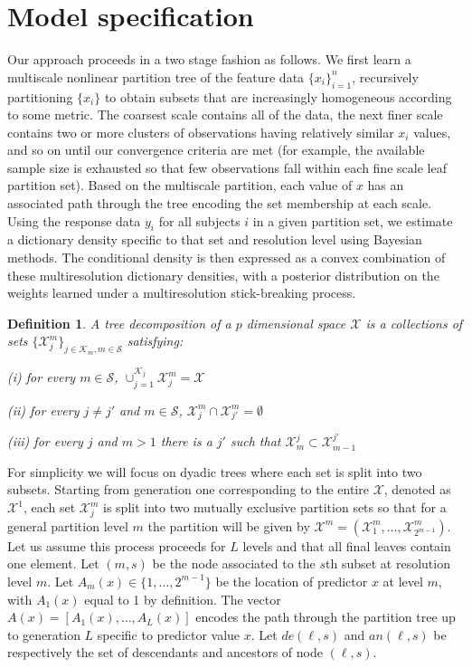 \documentclass{article} %
\newtheorem{definition}[theorem]{Definition}
\begin{document}
\section{Model specification} \label{section:model}

Our approach proceeds in a two stage fashion as follows. We first learn a multiscale nonlinear partition tree of the feature data $\{ x_i \}_{i=1}^n$, recursively partitioning $\{x_i \}$ to obtain subsets that are increasingly homogeneous according to some metric.  The coarsest scale contains all of the data, the next finer scale contains two or more clusters of observations having relatively similar $x_i$ values, and so on  until our convergence criteria are met (for example, the available sample size is exhausted so that few observations fall within each fine scale leaf partition set).  Based on the multiscale partition, each value of $x$ has an associated path through the tree encoding the set membership at each scale.  Using the response data $y_i$ for all subjects $i$ in a given partition set, we estimate a dictionary density specific to that set and resolution level using Bayesian methods.  The conditional density is then expressed as a convex combination of these multiresolution dictionary densities, with a posterior distribution on the weights learned under a multiresolution stick-breaking process.

\begin{definition}\label{Def:tree} A tree decomposition of a $p$ dimensional space $\mathcal{X}$ is a collections of sets $\{\mathcal{X}^m_j\}_{j \in \mathcal{K}_m,m \in \mathcal{S}}$ satisfying:

(i) for every $m\in \mathcal{S}$, $\cup_{j=1}^{\mathcal{K}_j} \mathcal{X}^{m}_j=\mathcal{X}$ 

(ii) for every $j\not= j'$ and $m \in \mathcal{S}$, $\mathcal{X}_j^m \cap \mathcal{X}_{j'}^m=\emptyset$ 

(iii) for every $j$ and $m>1$ there is a $j'$ such that $\mathcal{X}^j_m \subset \mathcal{X}^{j'}_{m-1}$
\end{definition}

\noindent For simplicity we will focus on dyadic trees where each set is split into two subsets. Starting from generation one corresponding to the entire $\mathcal{X}$, denoted as $\mathcal{X}^1$, each set $\mathcal{X}^m_j$ is split into two mutually exclusive partition sets so that for a general partition level $m$ the partition will be given by $\mathcal{X}^{m}=\left(\mathcal{X}^{m}_1, \ldots, \mathcal{X}^{m}_{2^{m-1}}\right)$. Let us assume this process proceeds for $L$ levels and that all final leaves contain one element. Let $(m,s)$ be the node associated to the $s$th subset at resolution level $m$. Let $A_{m}(x) \in \{1, \ldots, 2^{m-1}\}$ be the location of predictor $x$ at level $m$, with $A_1(x)$ equal to 1 by definition.  The vector $A(x)=[A_1(x), \ldots, A_L(x)]$ encodes the path through the partition tree up to generation $L$ specific to predictor value $x$. Let $de(\ell,s)$ and $an(\ell,s)$ be respectively the set of descendants and ancestors of node $(\ell, s)$. \\
\end{document}
